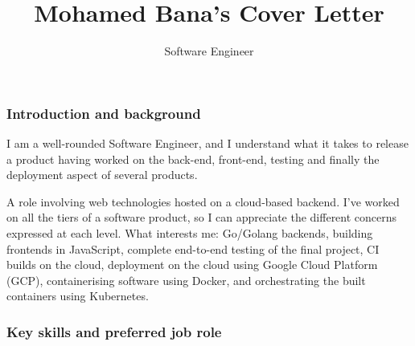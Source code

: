 \documentclass[
  a4paper,
]{article}
\title{Mohamed Bana's Cover Letter}
\author{Software Engineer}
\date{}
\begin{document}
\maketitle



\hypersetup{colorlinks,breaklinks,urlcolor=linkcolour,linkcolor=linkcolour} %


\renewcommand\UrlFont{\bfseries}

\hypertarget{introduction-and-background}{%
\subsubsection{Introduction and
background}\label{introduction-and-background}}

I am a well-rounded Software Engineer, and I understand what it takes to
release a product having worked on the back-end, front-end, testing and
finally the deployment aspect of several products.

A role involving web technologies hosted on a cloud-based backend. I've
worked on all the tiers of a software product, so I can appreciate the
different concerns expressed at each level. What interests me: Go/Golang
backends, building frontends in JavaScript, complete end-to-end testing
of the final project, CI builds on the cloud, deployment on the cloud
using Google Cloud Platform (GCP), containerising software using Docker,
and orchestrating the built containers using Kubernetes.

\hypertarget{key-skills-and-preferred-job-role}{%
\subsubsection{Key skills and preferred job
role}\label{key-skills-and-preferred-job-role}}
\end{document}
